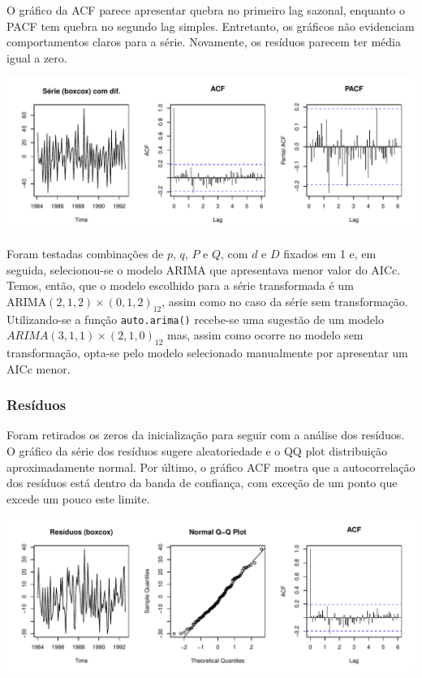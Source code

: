 \documentclass[
  letterpaper,
  DIV=11,
  numbers=noendperiod]{scrartcl}
\begin{document}
O gráfico da ACF parece apresentar quebra no primeiro lag sazonal,
enquanto o PACF tem quebra no segundo lag simples. Entretanto, os
gráficos não evidenciam comportamentos claros para a série. Novamente,
os resíduos parecem ter média igual a zero.

\includegraphics{T2_grupo5_files/figure-pdf/acf-pacf-arima-boxcox-1.pdf}

Foram testadas combinações de \(p\), \(q\), \(P\) e \(Q\), com \(d\) e
\(D\) fixados em 1 e, em seguida, selecionou-se o modelo ARIMA que
apresentava menor valor do AICc. Temos, então, que o modelo escolhido
para a série transformada é um
\(\text{ARIMA}(2,1,2)\times(0,1,2)_{12}\), assim como no caso da série
sem transformação. Utilizando-se a função \texttt{auto.arima()}
recebe-se uma sugestão de um modelo \(ARIMA(3,1,1)\times(2,1,0)_{12}\)
mas, assim como ocorre no modelo sem transformação, opta-se pelo modelo
selecionado manualmente por apresentar um AICc menor.

\hypertarget{resuxedduos-1}{%
\subsubsection{Resíduos}\label{resuxedduos-1}}

Foram retirados os zeros da inicialização para seguir com a análise dos
resíduos. O gráfico da série dos resíduos sugere aleatoriedade e o QQ
plot distribuição aproximadamente normal. Por último, o gráfico ACF
mostra que a autocorrelação dos resíduos está dentro da banda de
confiança, com exceção de um ponto que excede um pouco este limite.

\includegraphics{T2_grupo5_files/figure-pdf/residuos-arima-boxcox-1.pdf}
\end{document}
